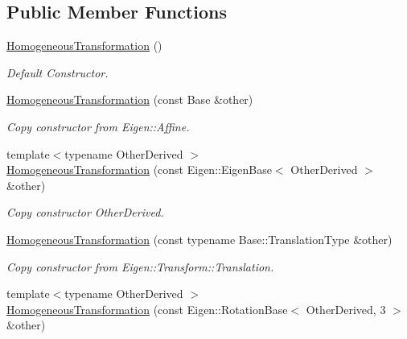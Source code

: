 \subsection*{Public Member Functions}
\begin{DoxyCompactItemize}
\item 
\hyperlink{classow__core_1_1HomogeneousTransformation_a6a2d52fc4ee38abbe480a6d5a8e5c773}{Homogeneous\+Transformation} ()\hypertarget{classow__core_1_1HomogeneousTransformation_a6a2d52fc4ee38abbe480a6d5a8e5c773}{}\label{classow__core_1_1HomogeneousTransformation_a6a2d52fc4ee38abbe480a6d5a8e5c773}

\begin{DoxyCompactList}\small\item\em Default Constructor. \end{DoxyCompactList}\item 
\hyperlink{classow__core_1_1HomogeneousTransformation_ac1d8792424c0af25dffd0c7e38981caa}{Homogeneous\+Transformation} (const Base \&other)
\begin{DoxyCompactList}\small\item\em Copy constructor from Eigen\+::\+Affine. \end{DoxyCompactList}\item 
{\footnotesize template$<$typename Other\+Derived $>$ }\\\hyperlink{classow__core_1_1HomogeneousTransformation_a453016dcb8a706ffb95abfd60a70f1df}{Homogeneous\+Transformation} (const Eigen\+::\+Eigen\+Base$<$ Other\+Derived $>$ \&other)
\begin{DoxyCompactList}\small\item\em Copy constructor Other\+Derived. \end{DoxyCompactList}\item 
\hyperlink{classow__core_1_1HomogeneousTransformation_a9def3964364fb962d1a69fe06686ee9e}{Homogeneous\+Transformation} (const typename Base\+::\+Translation\+Type \&other)\hypertarget{classow__core_1_1HomogeneousTransformation_a9def3964364fb962d1a69fe06686ee9e}{}\label{classow__core_1_1HomogeneousTransformation_a9def3964364fb962d1a69fe06686ee9e}

\begin{DoxyCompactList}\small\item\em Copy constructor from Eigen\+::\+Transform\+::\+Translation. \end{DoxyCompactList}\item 
{\footnotesize template$<$typename Other\+Derived $>$ }\\\hyperlink{classow__core_1_1HomogeneousTransformation_a8ebeed0581c35b89d96a847f01bceddb}{Homogeneous\+Transformation} (const Eigen\+::\+Rotation\+Base$<$ Other\+Derived, 3 $>$ \&other)\hypertarget{classow__core_1_1HomogeneousTransformation_a8ebeed0581c35b89d96a847f01bceddb}{}\label{classow__core_1_1HomogeneousTransformation_a8ebeed0581c35b89d96a847f01bceddb}


\end{DoxyCompactItemize}
